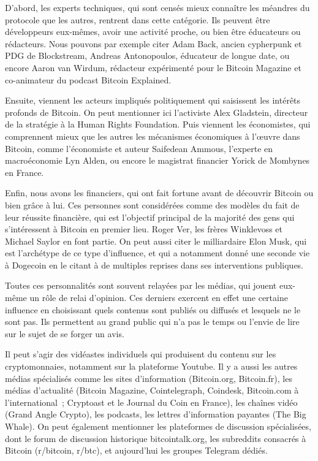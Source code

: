 D'abord, les experts techniques, qui sont censés mieux connaître les méandres du protocole que les autres, rentrent dans cette catégorie. Ils peuvent être développeurs eux-mêmes, avoir une activité proche, ou bien être éducateurs ou rédacteurs. Nous pouvons par exemple citer Adam Back, ancien cypherpunk et PDG de Blockstream, Andreas Antonopoulos, éducateur de longue date, ou encore Aaron van Wirdum, rédacteur expérimenté pour le Bitcoin Magazine et co-animateur du podcast Bitcoin Explained.

Ensuite, viennent les acteurs impliqués politiquement qui saisissent les intérêts profonds de Bitcoin. On peut mentionner ici l'activiste Alex Gladstein, directeur de la stratégie à la Human Rights Foundation. Puis viennent les économistes, qui comprennent mieux que les autres les mécanismes économiques à l'œuvre dans Bitcoin, comme l'économiste et auteur Saifedean Ammous, l'experte en macroéconomie Lyn Alden, ou encore le magistrat financier Yorick de Mombynes en France.

Enfin, nous avons les financiers, qui ont fait fortune avant de découvrir Bitcoin ou bien grâce à lui. Ces personnes sont considérées comme des modèles du fait de leur réussite financière, qui est l'objectif principal de la majorité des gens qui s'intéressent à Bitcoin en premier lieu. Roger Ver, les frères Winklevoss et Michael Saylor en font partie. On peut aussi citer le milliardaire Elon Musk, qui est l'archétype de ce type d'influence, et qui a notamment donné une seconde vie à Dogecoin en le citant à de multiples reprises dans ses interventions publiques.

Toutes ces personnalités sont souvent relayées par les médias, qui jouent eux-même un rôle de relai d'opinion. Ces derniers exercent en effet une certaine influence en choisissant quels contenus sont publiés ou diffusés et lesquels ne le sont pas. Ils permettent au grand public qui n'a pas le temps ou l'envie de lire sur le sujet de se forger un avis.

Il peut s'agir des vidéastes individuels qui produisent du contenu sur les cryptomonnaies, notamment sur la plateforme Youtube. Il y a aussi les autres médias spécialisés comme les sites d'information (Bitcoin.org, Bitcoin.fr), les médias d'actualité (Bitcoin Magazine, Cointelegraph, Coindesk, Bitcoin.com à l'international~; Cryptoast et le Journal du Coin en France), les chaînes vidéo (Grand Angle Crypto), les podcasts, les lettres d'information payantes (The Big Whale). On peut également mentionner les plateformes de discussion spécialisées, dont le forum de discussion historique bitcointalk.org, les subreddits consacrés à Bitcoin (r/bitcoin, r/btc), et aujourd'hui les groupes Telegram dédiés.

